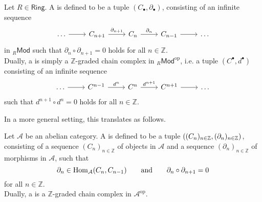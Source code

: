 \begin{definition}
	Let $R \in \mathsf{Ring}$. A  is defined to be a tuple $(C_\bullet,\partial_\bullet)$, consisting of an infinite sequence
	\begin{equation*}
		\begin{tikzcd}
			\dots \arrow[r] & C_{n + 1} \arrow[r,"\partial_{n + 1}"] & C_n \arrow[r,"\partial_n"] & C_{n - 1} \arrow[r] & \dots
		\end{tikzcd}
	\end{equation*}
	\noindent in $_{R}\mathsf{Mod}$ such that $\partial_n\circ \partial_{n + 1} = 0$ holds for all $n \in \mathbb{Z}$.\\
	Dually, a  is simply a $\mathbb{Z}$-graded chain complex in $_{R}\mathsf{Mod}^{\mathrm{op}}$, i.e. a tuple $(C^\bullet,d^\bullet)$ consisting of an infinite sequence
	\begin{equation*}
		\begin{tikzcd}
			\dots \arrow[r] & C^{n - 1} \arrow[r,"d^n"] & C^n \arrow[r,"d^{n + 1}"] & C^{n + 1} \arrow[r] & \dots
		\end{tikzcd}
	\end{equation*}
	\noindent such that $d^{n + 1} \circ d^n = 0$ holds for all $n \in \mathbb{Z}$.
\end{definition}

In a more general setting, this translates as follows.

\begin{definition}
	Let $\mathcal{A}$ be an abelian category. A  is defined to be a tuple $\del[0]{(C_n)_{n \in \mathbb{Z}},(\partial_n)_{n \in \mathbb{Z}}}$, consisting of a sequence $(C_n)_{n \in \mathbb{Z}}$ of objects in $\mathcal{A}$ and a sequence $(\partial_n)_{n \in \mathbb{Z}}$ of morphisms in $\mathcal{A}$, such that 
	\begin{equation*}
		\partial_n \in \operatorname{Hom}_\mathcal{A}(C_n,C_{n - 1}) \qquad \text{and} \qquad \partial_n \circ \partial_{n + 1} = 0
	\end{equation*}
	\noindent for all $n \in \mathbb{Z}$.\\
	Dually, a  is a $\mathbb{Z}$-graded chain complex in $\mathcal{A}^\mathrm{op}$. 
\end{definition}

